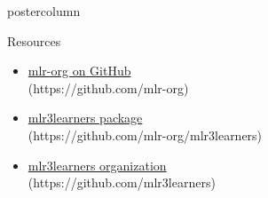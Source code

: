 \documentclass{beamer}
\begin{document}
\begin{withoutheader}
\begin{frame}[fragile]{}
\begin{columns}
\begin{column}{.245\textwidth}
\begin{beamercolorbox}[center]{postercolumn}
\begin{minipage}{.98\textwidth}
{\begin{myblock}{Resources}
\begin{itemize}
								\item \href{https://github.com/mlr-org}{mlr-org on GitHub}\\ (https://github.com/mlr-org)
								\item \href{https://github.com/mlr-org/mlr3learners}{mlr3learners package}\\ (https://github.com/mlr-org/mlr3learners)
								\item \href{https://github.com/mlr3learners}{mlr3learners organization}\\ (https://github.com/mlr3learners)
							\end{itemize}
						\end{myblock}
					\vfill}
				\end{minipage}
			\end{beamercolorbox}
		\end{column}
	\end{columns}
\end{frame}
\end{withoutheader}
\end{document}
